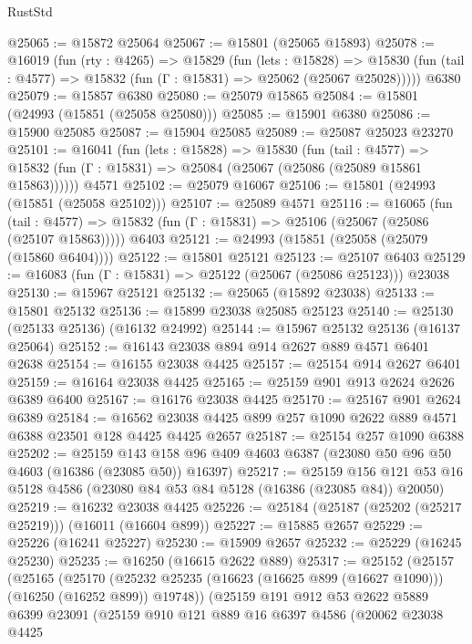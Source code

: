 \begin{lexlean}{RustStd}
\begin{coremodule}
@25065 := @15872 @25064
@25067 := @15801 (@25065 @15893)
@25078 := @16019
    (fun (rty : @4265) =>
    @15829
      (fun (lets : @15828) =>
      @15830 (fun (tail : @4577) => @15832 (fun (Γ : @15831) => @25062 (@25067 @25028)))))
    @6380
@25079 := @15857 @6380
@25080 := @25079 @15865
@25084 := @15801 (@24993 (@15851 (@25058 @25080)))
@25085 := @15901 @6380
@25086 := @15900 @25085
@25087 := @15904 @25085
@25089 := @25087 @25023 @23270
@25101 := @16041
    (fun (lets : @15828) =>
    @15830
      (fun (tail : @4577) =>
      @15832 (fun (Γ : @15831) => @25084 (@25067 (@25086 (@25089 @15861 @15863))))))
    @4571
@25102 := @25079 @16067
@25106 := @15801 (@24993 (@15851 (@25058 @25102)))
@25107 := @25089 @4571
@25116 := @16065
    (fun (tail : @4577) => @15832 (fun (Γ : @15831) => @25106 (@25067 (@25086 (@25107 @15863)))))
    @6403
@25121 := @24993 (@15851 (@25058 (@25079 (@15860 @6404))))
@25122 := @15801 @25121
@25123 := @25107 @6403
@25129 := @16083 (fun (Γ : @15831) => @25122 (@25067 (@25086 @25123))) @23038
@25130 := @15967 @25121
@25132 := @25065 (@15892 @23038)
@25133 := @15801 @25132
@25136 := @15899 @23038 @25085 @25123
@25140 := @25130 (@25133 @25136) (@16132 @24992)
@25144 := @15967 @25132 @25136 (@16137 @25064)
@25152 := @16143 @23038 @894 @914 @2627 @889 @4571 @6401 @2638
@25154 := @16155 @23038 @4425
@25157 := @25154 @914 @2627 @6401
@25159 := @16164 @23038 @4425
@25165 := @25159 @901 @913 @2624 @2626 @6389 @6400
@25167 := @16176 @23038 @4425
@25170 := @25167 @901 @2624 @6389
@25184 := @16562 @23038 @4425 @899 @257 @1090 @2622 @889 @4571 @6388 @23501 @128 @4425 @4425 @2657
@25187 := @25154 @257 @1090 @6388
@25202 := @25159
    @143
    @158
    @96
    @409
    @4603
    @6387
    (@23080 @50 @96 @50 @4603 (@16386 (@23085 @50)) @16397)
@25217 := @25159
    @156
    @121
    @53
    @16
    @5128
    @4586
    (@23080 @84 @53 @84 @5128 (@16386 (@23085 @84)) @20050)
@25219 := @16232 @23038 @4425
@25226 := @25184 (@25187 (@25202 (@25217 @25219))) (@16011 (@16604 @899))
@25227 := @15885 @2657
@25229 := @25226 (@16241 @25227)
@25230 := @15909 @2657
@25232 := @25229 (@16245 @25230)
@25235 := @16250 (@16615 @2622 @889)
@25317 := @25152
    (@25157
      (@25165
        (@25170 (@25232 @25235 (@16623 (@16625 @899 (@16627 @1090))) (@16250 (@16252 @899)) @19748))
        (@25159
          @191
          @912
          @53
          @2622
          @5889
          @6399
          @23091
          (@25159
            @910
            @121
            @889
            @16
            @6397
            @4586
            (@20062
              @23038
              @4425

\end{coremodule}
\end{lexlean}
